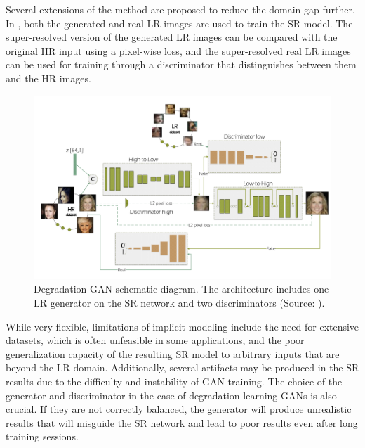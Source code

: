         Several extensions of the method are proposed to reduce the domain gap further. 
        In \cite{wei2020unsupervised}, both the generated and real LR images are used to train the SR model.
        The super-resolved version of the generated LR images can be compared with the original HR input using a pixel-wise loss, and the super-resolved real LR images can be used for training through a discriminator that distinguishes between them and the HR images.

        \begin{figure}[H]
            \centering
            \includegraphics[width=\textwidth]{Includes/2-degradation-gan.png}
            \caption{Degradation GAN schematic diagram. The architecture includes one LR generator on the SR network and two discriminators (Source: \cite{bulat2018learn}).}    
            \label{fig:2-degradation-gan}
        \end{figure}
        
    
        While very flexible, limitations of implicit modeling include the need for extensive datasets, which is often unfeasible in some applications, and the poor generalization capacity of the resulting SR model to arbitrary inputs that are beyond the LR domain. 
        Additionally, several artifacts may be produced in the SR results due to the difficulty and instability of GAN training.
        The choice of the generator and discriminator in the case of degradation learning GANs is also crucial. If they are not correctly balanced, the generator will produce unrealistic results that will misguide the SR network and lead to poor results even after long training sessions.

         
\clearpage